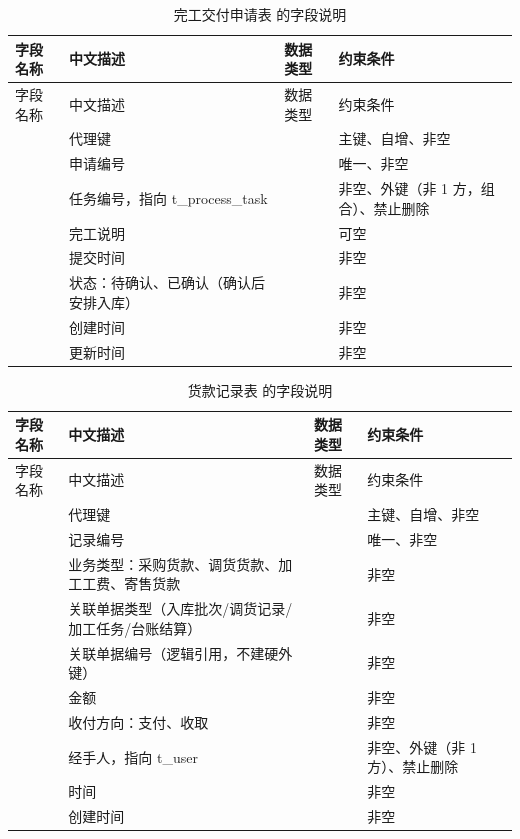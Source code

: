 \begin{longtable}{@{}L{3.5cm} L{4.1cm} L{2.9cm} L{4.0cm}@{}}
\caption{完工交付申请表  的字段说明}\label{tab:f-t-delivery-apply}\\
\toprule
字段名称 & 中文描述 & 数据类型 & 约束条件 \\
\midrule
\endfirsthead
\toprule
字段名称 & 中文描述 & 数据类型 & 约束条件 \\
\midrule
\endhead
\bottomrule
\endlastfoot
{} & 代理键 &  & 主键、自增、非空 \\
 & 申请编号 &  & 唯一、非空 \\
 & 任务编号，指向 t\_process\_task &  & 非空、外键（非 1 方，组合）、禁止删除 \\
 & 完工说明 &  & 可空 \\
 & 提交时间 &  & 非空 \\
 & 状态：待确认、已确认（确认后安排入库） &  & 非空 \\
 & 创建时间 &  & 非空 \\
 & 更新时间 &  & 非空 \\
\end{longtable}

\begin{longtable}{@{}L{3.5cm} L{4.1cm} L{2.9cm} L{4.0cm}@{}}
\caption{货款记录表  的字段说明}\label{tab:f-t-payment}\\
\toprule
字段名称 & 中文描述 & 数据类型 & 约束条件 \\
\midrule
\endfirsthead
\toprule
字段名称 & 中文描述 & 数据类型 & 约束条件 \\
\midrule
\endhead
\bottomrule
\endlastfoot
{} & 代理键 &  & 主键、自增、非空 \\
 & 记录编号 &  & 唯一、非空 \\
 & 业务类型：采购货款、调货货款、加工工费、寄售货款 &  & 非空 \\
 & 关联单据类型（入库批次/调货记录/加工任务/台账结算） &  & 非空 \\
 & 关联单据编号（逻辑引用，不建硬外键） &  & 非空 \\
 & 金额 &  & 非空 \\
 & 收付方向：支付、收取 &  & 非空 \\
 & 经手人，指向 t\_user &  & 非空、外键（非 1 方）、禁止删除 \\
 & 时间 &  & 非空 \\
 & 创建时间 &  & 非空 \\
\end{longtable}

